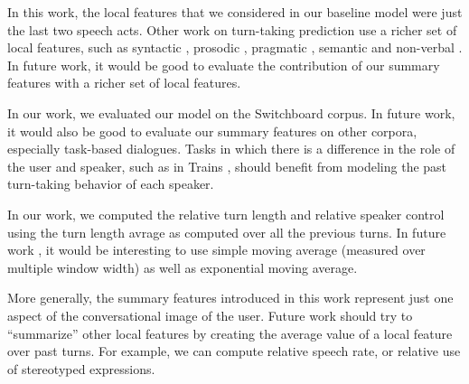 In this work, the local features that we considered in our baseline model were just the last two speech acts.  Other work on turn-taking prediction use a richer set of local features, such as
%
syntactic \cite{ duncan1972some, sacks1974simplest, ford1996interactional, de2006projecting, magyari2012prediction, atterer2008towards}, prosodic \cite{ duncan1972some, ford1996interactional, shriberg2000prosody, ferrer2003prosody, de2006projecting, reed2009units, raux2012optimizing, hariharan2001robust, atterer2008towards}, pragmatic \cite{ ford1996interactional, garrod2015use, raux2012optimizing}, semantic \cite{raux2012optimizing} and non-verbal \cite{kendon1967some}. In future work, it would be good to evaluate the contribution of our summary features with a richer set of local features.

In our work, we evaluated our model on the Switchboard corpus.  In future work, it would also be good to evaluate our summary features on other corpora, especially task-based dialogues.  Tasks in which there is a difference in the role of the user and speaker, such as in Trains \cite{HeemanAllen95:cdrom}, should benefit from modeling the past turn-taking behavior of each speaker.

In our work, we computed the relative turn length and relative speaker control using the turn length avrage as computed over all the previous turns. In future work , it would be interesting to use simple moving average (measured over multiple window width) as well as exponential moving average. 

More generally, the summary features introduced in this work represent just one aspect of the conversational image of the user. Future work should try to ``summarize'' other local features by creating
the average value of a local feature over past turns. For example, we can compute relative speech rate, or relative use of stereotyped expressions.
